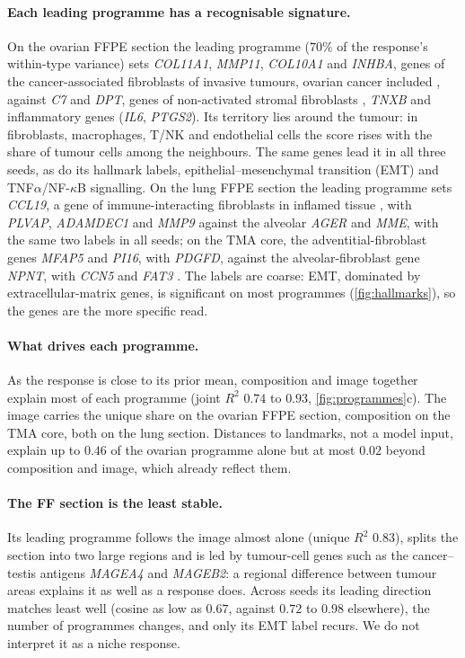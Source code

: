 \paragraph{Each leading programme has a recognisable signature.}
On the ovarian FFPE section the leading programme ($70\%$ of the response's within-type variance) sets \textit{COL11A1}, \textit{MMP11}, \textit{COL10A1} and \textit{INHBA}, genes of the cancer-associated fibroblasts of invasive tumours, ovarian cancer included \citep{kim2010multicancer,zhu2021adipose}, against \textit{C7} and \textit{DPT}, genes of non-activated stromal fibroblasts \citep{zhu2021adipose,buechler2021crosstissue}, \textit{TNXB} and inflammatory genes (\textit{IL6}, \textit{PTGS2}). Its territory lies around the tumour: in fibroblasts, macrophages, T/NK and endothelial cells the score rises with the share of tumour cells among the neighbours. The same genes lead it in all three seeds, as do its hallmark labels, epithelial--mesenchymal transition (EMT) and TNF$\alpha$/NF-$\kappa$B signalling. On the lung FFPE section the leading programme sets \textit{CCL19}, a gene of immune-interacting fibroblasts in inflamed tissue \citep{korsunsky2022stromal}, with \textit{PLVAP}, \textit{ADAMDEC1} and \textit{MMP9} against the alveolar \textit{AGER} and \textit{MME}, with the same two labels in all seeds; on the TMA core, the adventitial-fibroblast genes \textit{MFAP5} and \textit{PI16}, with \textit{PDGFD}, against the alveolar-fibroblast gene \textit{NPNT}, with \textit{CCN5} and \textit{FAT3} \citep{tsukui2020collagen,hanley2023lungcaf}. The labels are coarse: EMT, dominated by extracellular-matrix genes, is significant on most programmes (\cref{fig:hallmarks}), so the genes are the more specific read.

\paragraph{What drives each programme.}
As the response is close to its prior mean, composition and image together explain most of each programme (joint $R^2$ $0.74$ to $0.93$, \cref{fig:programmes}c). The image carries the unique share on the ovarian FFPE section, composition on the TMA core, both on the lung section. Distances to landmarks, not a model input, explain up to $0.46$ of the ovarian programme alone but at most $0.02$ beyond composition and image, which already reflect them.

\paragraph{The FF section is the least stable.}
Its leading programme follows the image almost alone (unique $R^2$ $0.83$), splits the section into two large regions and is led by tumour-cell genes such as the cancer--testis antigens \textit{MAGEA4} and \textit{MAGEB2}: a regional difference between tumour areas explains it as well as a response does. Across seeds its leading direction matches least well (cosine as low as $0.67$, against $0.72$ to $0.98$ elsewhere), the number of programmes changes, and only its EMT label recurs. We do not interpret it as a niche response.
